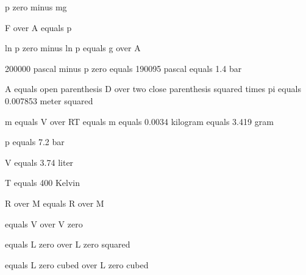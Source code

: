p zero minus mg

F over A equals p

ln p zero minus ln p equals g over A

200000 pascal minus p zero equals 190095 pascal equals 1.4 bar

A equals open parenthesis D over two close parenthesis squared times pi equals 0.007853 meter squared

m equals V over RT equals m equals 0.0034 kilogram equals 3.419 gram

p equals 7.2 bar

V equals 3.74 liter

T equals 400 Kelvin

R over M equals R over M

equals V over V zero

equals L zero over L zero squared

equals L zero cubed over L zero cubed